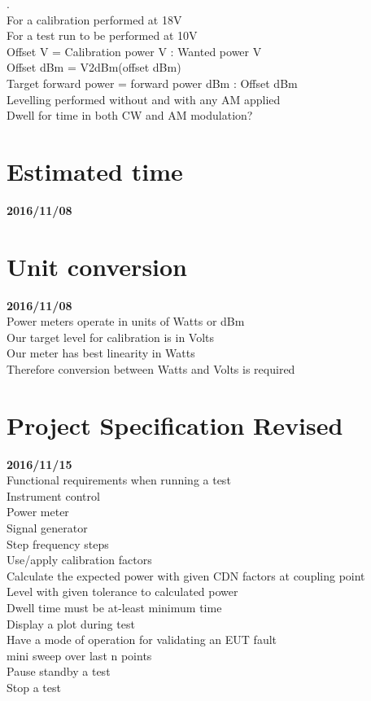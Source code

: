 
.\\
For a calibration performed at 18V\\
For a test run to be performed at 10V\\
Offset V = Calibration power V : Wanted power V\\
Offset dBm = V2dBm(offset dBm)\\
Target forward power = forward power dBm : Offset dBm\\

Levelling performed without and with any AM applied\\
Dwell for time in both CW and AM modulation?\\

\section{Estimated time}\textbf{2016/11/08}\\

\section{Unit conversion}\textbf{2016/11/08}\\
Power meters operate in units of Watts or dBm\\
Our target level for calibration is in Volts\\
Our meter has best linearity in Watts\\
Therefore conversion between Watts and Volts is required\\


\section{Project Specification Revised}\textbf{2016/11/15}\\

Functional requirements when running a test\\
Instrument control\\
  Power meter\\
  Signal generator\\
Step frequency steps\\
Use/apply calibration factors\\
Calculate the expected power with given CDN factors at coupling point\\
Level with given tolerance to calculated power\\
Dwell time must be at-least minimum time\\
Display a plot during test\\
Have a mode of operation for validating an EUT fault\\
  mini sweep over last n points\\
Pause standby a test\\
Stop a test\\


